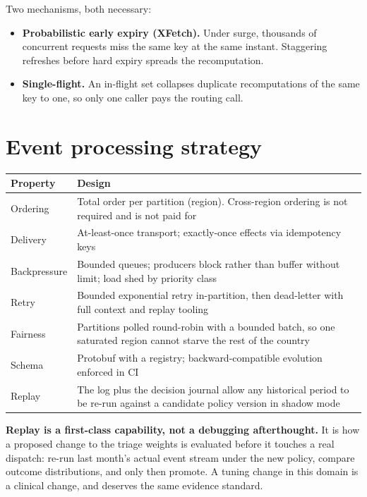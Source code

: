 Two mechanisms, both necessary:

\begin{itemize}
\item \textbf{Probabilistic early expiry (XFetch).} Under surge, thousands of
      concurrent requests miss the same key at the same instant. Staggering
      refreshes before hard expiry spreads the recomputation.
\item \textbf{Single-flight.} An in-flight set collapses duplicate
      recomputations of the same key to one, so only one caller pays the
      routing call.
\end{itemize}

\section{Event processing strategy}

\begin{center}\footnotesize
\begin{tabular}{@{}lp{88mm}@{}}
\toprule
\textbf{Property} & \textbf{Design} \\
\midrule
Ordering & Total order per partition (region). Cross-region ordering is not required and is not paid for \\
Delivery & At-least-once transport; exactly-once effects via idempotency keys \\
Backpressure & Bounded queues; producers block rather than buffer without limit; load shed by priority class \\
Retry & Bounded exponential retry in-partition, then dead-letter with full context and replay tooling \\
Fairness & Partitions polled round-robin with a bounded batch, so one saturated region cannot starve the rest of the country \\
Schema & Protobuf with a registry; backward-compatible evolution enforced in CI \\
Replay & The log plus the decision journal allow any historical period to be re-run against a candidate policy version in shadow mode \\
\bottomrule
\end{tabular}
\end{center}

\begin{keybox}
\textbf{Replay is a first-class capability, not a debugging afterthought.}
It is how a proposed change to the triage weights is evaluated before it
touches a real dispatch: re-run last month's actual event stream under the new
policy, compare outcome distributions, and only then promote. A tuning change
in this domain is a clinical change, and deserves the same evidence standard.
\end{keybox}

